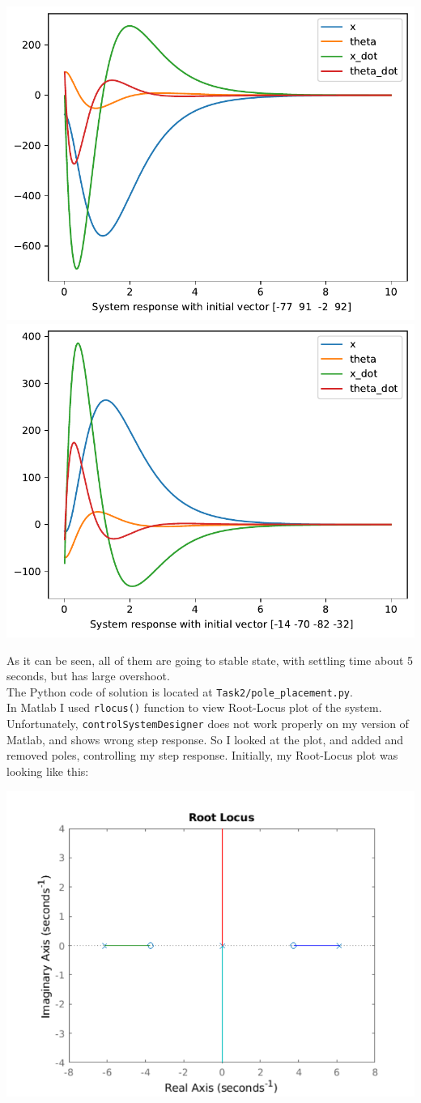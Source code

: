 \documentclass[a4paper,12pt]{article}
\begin{document}
    \begin{center}
        \includegraphics[width=0.49\linewidth]{../Task2/Fig3.pdf}
        \includegraphics[width=0.49\linewidth]{../Task2/Fig4.pdf}
    \end{center}
    As it can be seen, all of them are going to stable state, with settling time
    about 5 seconds, but has large overshoot.\\
    The Python code of solution is located at \texttt{Task2/pole\_placement.py}.\\
    In Matlab I used \texttt{rlocus()} function to view Root-Locus plot of the 
    system. Unfortunately, \texttt{controlSystemDesigner} does not work properly
    on my version of Matlab, and shows wrong step response. So I looked at the 
    plot, and added and removed poles, controlling my step response.
    Initially, my Root-Locus plot was looking like this:\\
    \begin{center}
        \includegraphics[width=0.7\linewidth]{../Task2/RLinit.pdf}
    \end{center}
\end{document}
